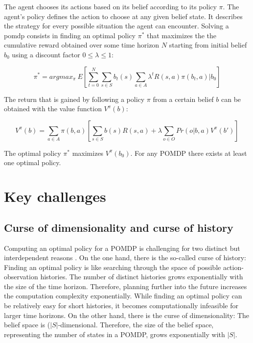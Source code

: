 The agent chooses its actions based on its belief according to its policy $\pi$. The agent's policy defines the action to choose at any given belief state. It describes the strategy for every possible situation the agent can encounter. Solving a \gls{pomdp} consists in finding an optimal policy $\pi^*$ that maximizes the the cumulative reward obtained over some time horizon $N$ starting from initial belief $b_0$ using a discount factor $0 \leq \lambda \leq 1$:

\begin{equation}
    \pi^* = argmax_{\pi}~E\left[ \sum_{t=0}^{N} \sum_{s \in S}b_t(s) \sum_{a \in A} \lambda^t R(s,a) \pi(b_t,a) | b_0\right]
\end{equation}

The return that is gained by following a policy $\pi$ from a certain belief $b$ can be obtained with the value function $V^\pi(b)$:

\begin{equation}
    V^\pi(b) = \sum_{a \in A} \pi(b,a) \left[ \sum_{s \in S} b(s) R(s,a) + \lambda \sum_{o \in O} Pr(o | b, a) V^\pi(b')\right]
\end{equation}

The optimal policy $\pi^*$ maximizes $V^\pi(b_0)$. For any POMDP there exists at least one optimal policy.

\section{Key challenges}

\subsection{Curse of dimensionality and curse of history}
\label{sec:curses}

Computing an optimal policy for a POMDP is challenging for two distinct but interdependent reasons \parencite{pomdp_curses}. On the one hand, there is the so-called curse of history: Finding an optimal policy is like searching through the space of possible action-observation histories. The number of distinct histories grows exponentially with the size of the time horizon. Therefore, planning further into the future increases the computation complexity exponentially. While finding an optimal policy can be relatively easy for short histories, it becomes computationally infeasible for larger time horizons. On the other hand, there is the curse of dimensionality: The belief space is ($|S|$-dimensional. Therefore, the size of the belief space, representing the number of states in a POMDP, grows exponentially with $|S|$.

